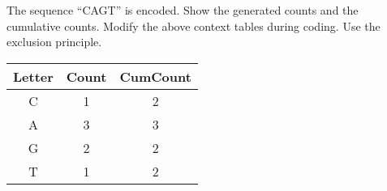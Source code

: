 \begin{question}
The sequence “CAGT” is encoded. Show the generated counts and the cumulative counts.
Modify the above context tables during coding. Use the exclusion principle.
\end{question}
\begin{solution}
\begin{tabular}{|c|c|c|}
\hline 
Letter & Count & CumCount \\ 
\hline 
C & 1 & 2 \\ 
\hline 
A & 3 & 3 \\ 
\hline 
G & 2 & 2 \\ 
\hline 
T & 1 & 2 \\ 
\hline 
\end{tabular}  \\



\end{solution}
